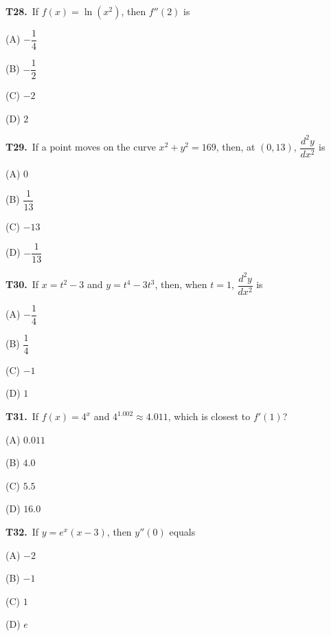 \documentclass[11pt]{article}
\begin{document}
\bigskip\noindent\textbf{T28.}\ If $f(x) = \ln(x^2)$, then $f''(2)$ is
\begin{list}{}{\setlength{\leftmargin}{3em}\setlength{\labelwidth}{2.5em}\setlength{\itemsep}{0pt}\setlength{\topsep}{2pt}}
\item[(A)] $-\dfrac{1}{4}$
\item[(B)] $-\dfrac{1}{2}$
\item[(C)] $-2$
\item[(D)] $2$
\end{list}

\bigskip\noindent\textbf{T29.}\ If a point moves on the curve $x^2+y^2=169$, then, at $(0,13)$, $\dfrac{d^2y}{dx^2}$ is
\begin{list}{}{\setlength{\leftmargin}{3em}\setlength{\labelwidth}{2.5em}\setlength{\itemsep}{0pt}\setlength{\topsep}{2pt}}
\item[(A)] $0$
\item[(B)] $\dfrac{1}{13}$
\item[(C)] $-13$
\item[(D)] $-\dfrac{1}{13}$
\end{list}

\bigskip\noindent\textbf{T30.}\ If $x = t^2-3$ and $y = t^4-3t^3$, then, when $t=1$, $\dfrac{d^2y}{dx^2}$ is
\begin{list}{}{\setlength{\leftmargin}{3em}\setlength{\labelwidth}{2.5em}\setlength{\itemsep}{0pt}\setlength{\topsep}{2pt}}
\item[(A)] $-\dfrac{1}{4}$
\item[(B)] $\dfrac{1}{4}$
\item[(C)] $-1$
\item[(D)] $1$
\end{list}

\bigskip\noindent\textbf{T31.}\ If $f(x) = 4^x$ and $4^{1.002} \approx 4.011$, which is closest to $f'(1)$?
\begin{list}{}{\setlength{\leftmargin}{3em}\setlength{\labelwidth}{2.5em}\setlength{\itemsep}{0pt}\setlength{\topsep}{2pt}}
\item[(A)] $0.011$
\item[(B)] $4.0$
\item[(C)] $5.5$
\item[(D)] $16.0$
\end{list}

\bigskip\noindent\textbf{T32.}\ If $y = e^x(x-3)$, then $y''(0)$ equals
\begin{list}{}{\setlength{\leftmargin}{3em}\setlength{\labelwidth}{2.5em}\setlength{\itemsep}{0pt}\setlength{\topsep}{2pt}}
\item[(A)] $-2$
\item[(B)] $-1$
\item[(C)] $1$
\item[(D)] $e$
\end{list}
\end{document}
